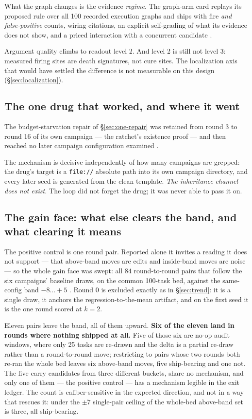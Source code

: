 What the graph changes is the evidence \emph{regime}. The graph-arm card
replays its proposed rule over all 100 recorded execution graphs and ships
with fire \emph{and false-positive} counts, wiring citations, an explicit
self-grading of what its evidence does not show, and a priced interaction
with a concurrent candidate .

Argument quality climbs to readout level 2. And level 2 is still not level
3: measured firing sites are death signatures, not cure sites. The
localization axis that would have settled the difference is not measurable
on this design (\S\ref{sec:localization}).

\subsection*{The one drug that worked, and where it went}

The budget-starvation repair of \S\ref{sec:one-repair} was retained from
round 3 to round 16 of its own campaign --- the ratchet's existence proof
--- and then reached no later campaign configuration examined .

The mechanism is decisive independently of how many campaigns are grepped:
the drug's target is a \texttt{file://} absolute path into its own campaign
directory, and every later seed is generated from the clean template.
\emph{The inheritance channel does not exist.} The loop did not forget the
drug; it was never able to pass it on.

\subsection*{The gain face: what else clears the band, and what clearing it
             means}
\label{sec:gain-face}

The positive control is one round pair. Reported alone it invites a reading
it does not support --- that above-band moves are edits and inside-band
moves are noise --- so the whole gain face was swept: all $84$
round-to-round pairs that follow the six campaigns' baseline draws, on the
common 100-task bed, against the same-config band $-8\ldots{+}5$ .
Round 0 is excluded exactly as in \S\ref{sec:trend}: it is a single draw,
it anchors the regression-to-the-mean artifact, and on the first seed it is
the one round scored at $k{=}2$.

Eleven pairs leave the band, all of them upward. \textbf{Six of the eleven
land in rounds where nothing shipped at all.} Five of those six are no-op
audit windows, where only 25 tasks are re-drawn and the delta is a partial
re-draw rather than a round-to-round move; restricting to pairs whose two
rounds both re-ran the whole bed leaves six above-band moves, five
ship-bearing and one not. The five carry candidates from three different
buckets, share no mechanism, and only one of them --- the positive control
--- has a mechanism legible in the exit ledger. The count is
caliber-sensitive in the expected direction, and not in a way that rescues
it: under
the $\pm 7$ single-pair ceiling of  the whole-bed above-band set is
three, all ship-bearing.

